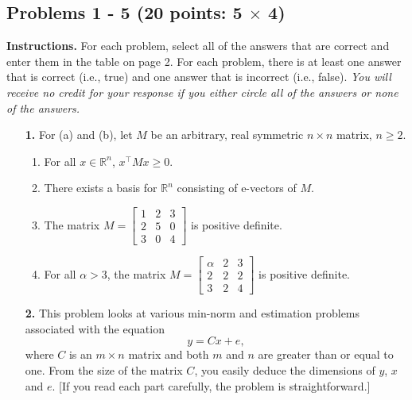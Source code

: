 \documentclass[letterpaper]{article}
\newcommand{\real}{\mathbb R}  %
\begin{document}
\newpage



\subsection*{Problems 1 - 5 {\rm (20 points: 5 $\times$ 4)}}

{\bf Instructions.} For each problem, select all of the answers that are correct and enter them in the table on page 2. For each problem, there is at least one answer that is correct (i.e., true) and one answer that is incorrect (i.e., false). \textit{You will receive no credit for your response if you either circle all of the answers or none of the answers.}

\vspace{0.5in}


\begin{enumerate}
\setlength{\itemsep}{5cm}


\item[{\bf 1.}] For (a) and (b), let $M$ be an arbitrary, real symmetric $n \times n$ matrix, $n\ge 2$.
\begin{enumerate}
\setlength{\itemsep}{.15in}
\renewcommand{\labelenumi}{(\alph{enumi})}
\setlength{\itemsep}{.1in}
\item For all $x\in \real^n$, $x^\top M x \ge 0$.
\item There exists a basis for $\real^n$ consisting of e-vectors of $M$.
\item The matrix $M= \left[ \begin{array}{rrr}  1&   2&   3\\  2&   5&   0\\  3&   0&  4\end{array}\right]$ is positive definite.
\item For all $\alpha >3 $, the matrix $M= \left[ \begin{array}{rrr}  \alpha&   2&   3\\  2&   2&   2\\  3&   2&  4\end{array}\right]$ is positive definite.
\end{enumerate}

\vspace*{-2cm}
\item[{\bf 2.}] This problem looks at various min-norm and estimation problems associated with the equation
$$y = Cx + e,$$
where $C$ is an $m \times n$ matrix and both $m$ and $n$ are greater than or equal to one. From the size of the matrix $C$, you easily deduce the dimensions of $y$, $x$ and $e$. [If you read each part carefully, the problem is straightforward.]


\end{enumerate}
\end{document}
